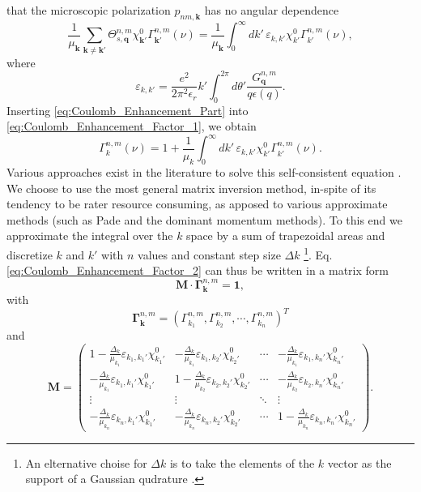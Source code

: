 that the microscopic polarization $p_{nm,\mathbf{k}}$ has no angular
dependence\begin{equation}
\frac{1}{\mu_{\mathbf{k}}}\sum_{\mathbf{k}\neq\mathbf{k}'}\Theta_{s,\mathbf{q}}^{n,m}\chi_{\mathbf{k}'}^{0}\Gamma_{\mathbf{k}'}^{n,m}(\nu)=\frac{1}{\mu_{\mathbf{k}}}\int_{0}^{\infty}dk'\,\varepsilon_{k,k'}\chi_{k'}^{0}\Gamma_{k'}^{n,m}(\nu),\label{eq:Coulomb_Enhancement_Part}\end{equation}
where \begin{equation}
\varepsilon_{k,k'}=\frac{e^{2}}{2\pi^{2}\epsilon_{r}}k'\int_{0}^{2\pi}d\theta'\frac{G_{\mathbf{q}}^{n,m}}{q\epsilon(q)}.\end{equation}
Inserting \ref{eq:Coulomb_Enhancement_Part} into \ref{eq:Coulomb_Enhancement_Factor_1},
we obtain \begin{equation}
\Gamma_{k}^{n,m}(\nu)=1+\frac{1}{\mu_{k}}\int_{0}^{\infty}dk'\,\varepsilon_{k,k'}\chi_{k'}^{0}\Gamma_{k'}^{n,m}(\nu).\label{eq:Coulomb_Enhancement_Factor_2}\end{equation}
Various approaches exist in the literature to solve this self-consistent
equation \citet{Haug2009,Chow1994}. We choose to use the most general
matrix inversion method, in-spite of its tendency to be rater resource
consuming, as apposed to various approximate methods (such as Pade
and the dominant momentum methods). To this end we approximate the
integral over the $k$ space by a sum of trapezoidal areas and discretize
$k$ and $k'$ with $n$ values and constant step size $\Delta k$%
\footnote{An elternative choise for $\Delta k$ is to take the elements of the
$k$ vector as the support of a Gaussian qudrature \citet{haug_quantum_1994}. %
}. Eq. \ref{eq:Coulomb_Enhancement_Factor_2} can thus be written in
a matrix form\begin{equation}
\mathbf{M}\cdot\mathbf{\boldsymbol{\Gamma}}_{\mathbf{k}}^{n,m}=\mathbf{1},\label{eq:Coulomb_Enhancement_Factor_3}\end{equation}
with \begin{equation}
\mathbf{\boldsymbol{\Gamma}}_{\mathbf{k}}^{n,m}=\left(\Gamma_{k_{1}}^{n,m},\Gamma_{k_{2}}^{n,m},\cdots,\Gamma_{k_{n}}^{n,m}\right)^{T}\end{equation}
and \begin{equation}
\mathbf{M}=\left(\begin{array}{cccc}
1-\frac{\Delta_{k}}{\mu_{k_{1}}}\varepsilon_{k_{1},k_{1}'}\chi_{k_{1}'}^{0} & -\frac{\Delta_{k}}{\mu_{k_{1}}}\varepsilon_{k_{1},k_{2}'}\chi_{k_{2}'}^{0} & \cdots & -\frac{\Delta_{k}}{\mu_{k_{1}}}\varepsilon_{k_{1},k_{n}'}\chi_{k_{n}'}^{0}\\
-\frac{\Delta_{k}}{\mu_{k_{1}}}\varepsilon_{k_{1},k_{1}'}\chi_{k_{1}'}^{0} & 1-\frac{\Delta_{k}}{\mu_{k_{2}}}\varepsilon_{k_{2},k_{2}'}\chi_{k_{2}'}^{0} & \cdots & -\frac{\Delta_{k}}{\mu_{k_{2}}}\varepsilon_{k_{2},k_{n}'}\chi_{k_{n}'}^{0}\\
\vdots & \vdots & \ddots & \vdots\\
-\frac{\Delta_{k}}{\mu_{k_{n}}}\varepsilon_{k_{n},k_{1}'}\chi_{k_{1}'}^{0} & -\frac{\Delta_{k}}{\mu_{k_{n}}}\varepsilon_{k_{n},k_{2}'}\chi_{k_{2}'}^{0} & \cdots & 1-\frac{\Delta_{k}}{\mu_{k_{n}}}\varepsilon_{k_{n},k_{n}'}\chi_{k_{n}'}^{0}\end{array}\right).\end{equation}
